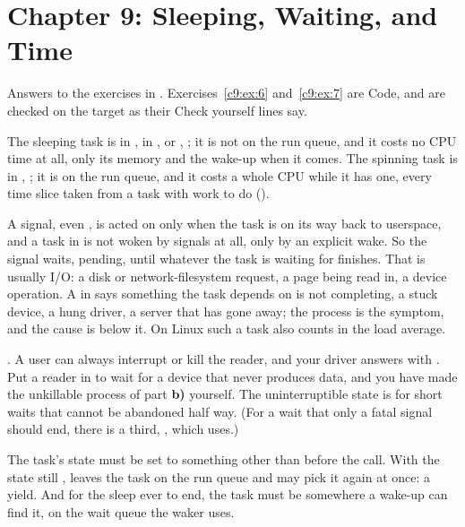 
\section{Chapter 9: Sleeping, Waiting, and Time}
\label{sol:sec:c9}
Answers to the exercises in . Exercises~\ref{c9:ex:6} and~\ref{c9:ex:7}
are Code, and are checked on the target as their Check yourself lines say.


 The sleeping task is in ,  in , or
, ; it is not on the run queue, and it costs no CPU time at all,
only its memory and the wake-up when it comes. The spinning task is in ,
; it is on the run queue, and it costs a whole CPU while it has one, every time slice taken
from a task with work to do ().

 A signal, even , is acted on only when the task is on its way back to
userspace, and a task in  is not woken by signals at all, only by an
explicit wake. So the signal waits, pending, until whatever the task is waiting for finishes. That
is usually I/O: a disk or network-filesystem request, a page being read in, a device operation. A
 in  says something the task depends on is not completing, a stuck device, a hung
driver, a server that has gone away; the process is the symptom, and the cause is below it. On
Linux such a task also counts in the load average.

 . A user can always interrupt or kill the reader, and your
driver answers with . Put a reader in  to wait for a
device that never produces data, and you have made the unkillable  process of part
\textbf{b)} yourself. The uninterruptible state is for short waits that cannot be abandoned half
way. (For a wait that only a fatal signal should end, there is a third, , which
 uses.)

 The task's state must be set to something other than  before the call.
With the state still ,  leaves the task on the run queue and
may pick it again at once: a yield. And for the sleep ever to end, the task must be somewhere a
wake-up can find it, on the wait queue the waker uses.

